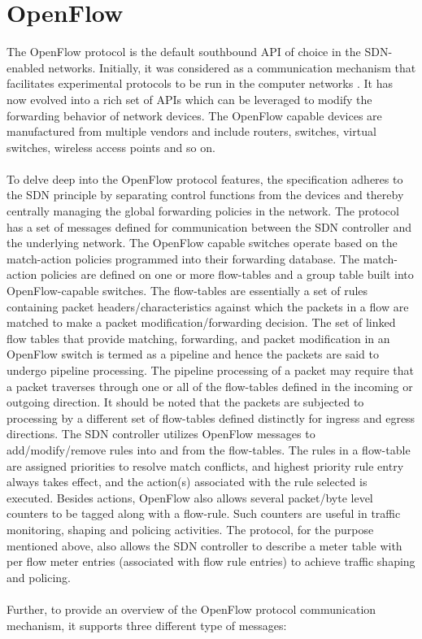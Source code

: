 \section{OpenFlow}
The OpenFlow protocol is the default southbound API of choice in the SDN-enabled networks. Initially, it was considered as a communication mechanism that facilitates experimental protocols to be run in the computer networks \cite{OpenFlow-White-Paper}. It has now evolved into a rich set of APIs which can be leveraged to modify the forwarding behavior of network devices. The OpenFlow capable devices are manufactured from multiple vendors and include routers, switches, virtual switches, wireless access points\cite{OFArchive} and so on. \\\\To delve deep into the OpenFlow protocol features, the specification adheres to the SDN principle by separating control functions from the devices and thereby centrally managing the global forwarding policies in the network. The protocol has a set of messages defined for communication between the SDN controller and the underlying network. The OpenFlow capable switches operate based on the match-action policies programmed into their forwarding database. The match-action policies are defined on one or more flow-tables and a group table built into OpenFlow-capable switches. The flow-tables are essentially a set of rules containing packet headers/characteristics against which the packets in a flow are matched to make a packet modification/forwarding decision. The set of linked flow tables that provide matching, forwarding, and packet modification in an OpenFlow switch is termed as a pipeline \cite{OFSwitchSpecification} and hence the packets are said to undergo pipeline processing.  The pipeline processing of a packet may require that a packet traverses through one or all of the flow-tables defined in the incoming or outgoing direction. It should be noted that the packets are subjected to processing by a different set of flow-tables defined distinctly for ingress and egress directions. The SDN controller utilizes OpenFlow messages to add/modify/remove rules into and from the flow-tables.
The rules in a flow-table are assigned priorities to resolve match conflicts, and highest priority rule entry always takes effect, and the action(s) associated with the rule selected is executed. Besides actions, OpenFlow also allows several packet/byte level counters to be tagged along with a flow-rule. Such counters are useful in traffic monitoring, shaping and policing activities. The protocol, for the purpose mentioned above, also allows the SDN controller to describe a meter table with per flow meter entries (associated with flow rule entries) to achieve traffic shaping and policing. \\\\ Further, to provide an overview of the OpenFlow protocol communication mechanism, it supports three different type of messages:
